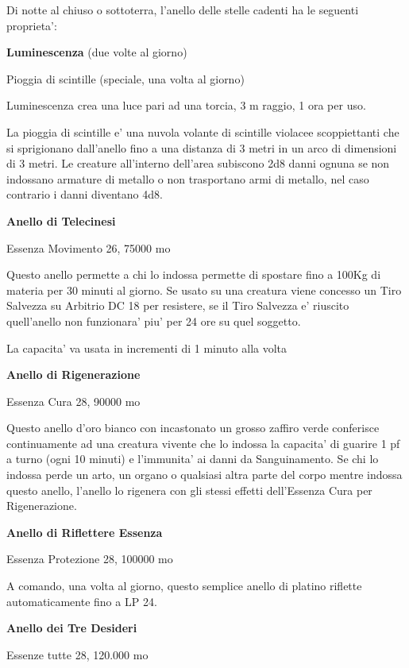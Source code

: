 \documentclass[a4paper,11pt,twoside,openany]{book}
\begin{document}
{		Di notte al chiuso o sottoterra, l'anello delle stelle cadenti ha le seguenti proprieta':
		
		\textbf{Luminescenza} (due volte al giorno)
		
		Pioggia di scintille (speciale, una volta al giorno)
		
		Luminescenza crea una luce pari ad una torcia, 3 m raggio, 1 ora per
		uso.
		
		La pioggia di scintille e' una nuvola volante di scintille violacee scoppiettanti che si sprigionano dall'anello fino a una distanza di 3 metri in un arco di dimensioni di 3 metri. Le creature all'interno dell'area subiscono 2d8 danni ognuna se non indossano armature di metallo o non trasportano armi di metallo, nel caso contrario i danni diventano 4d8.
		
		\textbf{Anello di Telecinesi}
		
		Essenza Movimento 26, 75000 mo
		
		Questo anello permette a chi lo indossa permette di spostare fino a 100Kg di materia per 30 minuti al giorno. Se usato su una creatura viene concesso un Tiro Salvezza su Arbitrio DC 18 per resistere, se il Tiro Salvezza e' riuscito quell'anello non funzionara' piu' per 24 ore su quel soggetto.
		
		La capacita' va usata in incrementi di 1 minuto alla volta
		
		\textbf{Anello di Rigenerazione}
		
		Essenza Cura 28, 90000 mo
		
		Questo anello d'oro bianco con incastonato un grosso zaffiro verde conferisce continuamente ad una creatura vivente che lo indossa la capacita' di guarire 1 pf a turno (ogni 10 minuti) e l'immunita' ai danni da Sanguinamento. Se chi lo indossa perde un arto, un organo o qualsiasi altra parte del corpo mentre indossa questo anello, l'anello lo rigenera con gli stessi effetti dell'Essenza Cura per Rigenerazione.
		
		\textbf{Anello di Riflettere Essenza}
		
		Essenza Protezione 28, 100000 mo
		
		A comando, una volta al giorno, questo semplice anello di platino riflette automaticamente fino a LP 24.
		
		\textbf{Anello dei Tre Desideri}
		
		Essenze tutte 28, 120.000 mo
		
}
\end{document}
